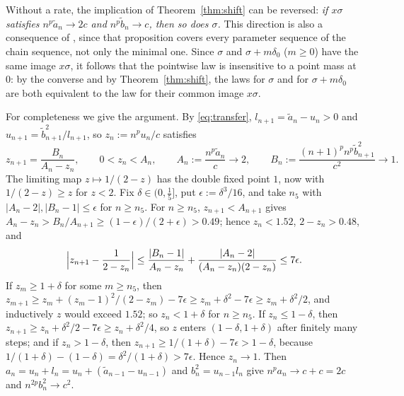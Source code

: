 \begin{remark}\label{rem:converse}
Without a rate, the implication of Theorem~\ref{thm:shift} can be reversed: \emph{if $x\sigma$ satisfies
$n^p\tilde a_n\to2c$ and $n^p\tilde b_n\to c$, then so does $\sigma$.} This direction is also a consequence of
\cite[Proposition~2.1]{DPQ}, since that proposition covers every parameter sequence of the chain sequence, not only the
minimal one. Since $\sigma$ and $\sigma+m\delta_0$ ($m\ge0$) have the same image $x\sigma$, it follows that the pointwise law
is insensitive to a point mass at $0$: by the converse and by Theorem~\ref{thm:shift}, the laws for $\sigma$ and for
$\sigma+m\delta_0$ are both equivalent to the law for their common image $x\sigma$.

For completeness we give the argument. By \eqref{eq:transfer}, $l_{n+1}=\tilde a_n-u_n>0$ and
$u_{n+1}=\tilde b_{n+1}^2/l_{n+1}$, so $z_n:=n^pu_n/c$ satisfies
\[
  z_{n+1}=\frac{B_n}{A_n-z_n},\qquad 0<z_n<A_n,\qquad A_n:=\frac{n^p\tilde a_n}c\to2,\qquad
  B_n:=\frac{(n+1)^pn^p\tilde b_{n+1}^2}{c^2}\to1 .
\]
The limiting map $z\mapsto1/(2-z)$ has the double fixed point $1$, now with $1/(2-z)\ge z$ for $z<2$. Fix
$\delta\in(0,\frac15]$, put $\epsilon:=\delta^3/16$, and take $n_5$ with $|A_n-2|,|B_n-1|\le\epsilon$ for $n\ge n_5$. For $n\ge n_5$,
$z_{n+1}<A_{n+1}$ gives $A_n-z_n>B_n/A_{n+1}\ge(1-\epsilon)/(2+\epsilon)>0.49$; hence $z_n<1.52$, $2-z_n>0.48$, and
\[
  \Bigl|z_{n+1}-\frac1{2-z_n}\Bigr|\le\frac{|B_n-1|}{A_n-z_n}+\frac{|A_n-2|}{(A_n-z_n)(2-z_n)}\le7\epsilon .
\]
If $z_m\ge1+\delta$ for some $m\ge n_5$, then $z_{m+1}\ge z_m+(z_m-1)^2/(2-z_m)-7\epsilon\ge z_m+\delta^2-7\epsilon\ge
z_m+\delta^2/2$, and inductively $z$ would exceed $1.52$; so $z_n<1+\delta$ for $n\ge n_5$. If $z_n\le1-\delta$, then
$z_{n+1}\ge z_n+\delta^2/2-7\epsilon\ge z_n+\delta^2/4$, so $z$ enters $(1-\delta,1+\delta)$ after finitely many steps; and if
$z_n>1-\delta$, then $z_{n+1}\ge1/(1+\delta)-7\epsilon>1-\delta$, because $1/(1+\delta)-(1-\delta)=\delta^2/(1+\delta)>7\epsilon$. Hence
$z_n\to1$. Then $a_n=u_n+l_n=u_n+(\tilde a_{n-1}-u_{n-1})$ and $b_n^2=u_{n-1}l_n$ give $n^pa_n\to c+c=2c$ and
$n^{2p}b_n^2\to c^2$.
\end{remark}

